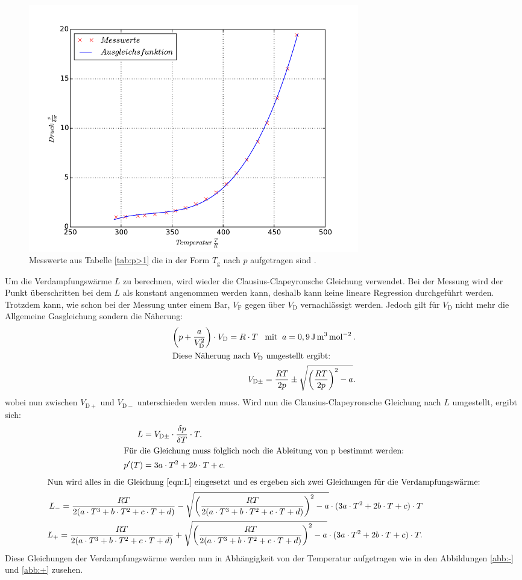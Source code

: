 \begin{figure}
  \centering
  \includegraphics[width=0.7\textwidth]{plot2.pdf}
  \caption{Messwerte aus Tabelle \ref{tab:p>1} die in der Form $T_\mathrm{g}$ nach $p$ aufgetragen sind .}
  \label{abb:plot2}
\end{figure}
\FloatBarrier
Um  die Verdampfungswärme $L$ zu berechnen,
wird wieder die Clausius-Clapeyronsche Gleichung
verwendet. Bei der Messung wird der Punkt überschritten bei dem $L$ als konstant angenommen werden kann, deshalb kann
keine lineare Regression durchgeführt werden.
Trotzdem kann, wie schon bei der Messung unter einem Bar,
$V_\mathrm{F}$ gegen über $V_\mathrm{D}$ vernachlässigt werden.
Jedoch gilt für $V_\mathrm{D}$ nicht mehr die Allgemeine
Gasgleichung sondern die Näherung:
\begin{align}
\left(p+\frac{a}{V_\mathrm{D}^2}\right)\cdot V_\mathrm{D}=R\cdot T \; \; \; \text{mit} \;\; a=0,9\,\si{\joule\cubic\meter\per\mol\tothe{2}}\,.\\
\intertext{Diese Näherung nach $V_\mathrm{D}$ umgestellt ergibt:}
V_{\mathrm{D\pm}}=\frac{RT}{2p}\pm\sqrt{\left(\frac{RT}{2p}\right)^2-a}.
\end{align}
wobei nun zwischen $V_\mathrm{D+}$ und  $V_\mathrm{D-}$ unterschieden werden muss.
Wird nun die Clausius-Clapeyronsche Gleichung nach $L$ umgestellt, ergibt sich:
\begin{align}
L&=V_\mathrm{D\pm}\cdot \frac{\delta p}{\delta T} \cdot T.\label{eqn:L}\\
\intertext{Für die Gleichung muss folglich noch die Ableitung von p bestimmt werden:}
p'(T)&=3a\cdot T^2+ 2b\cdot T + c.
\end{align}
\begin{align}
\intertext{Nun wird alles in die Gleichung \eqref{eqn:L} eingesetzt und es ergeben sich zwei Gleichungen für die Verdampfungswärme:}
L_-=\frac{RT}{2(a\cdot T^3+b\cdot T^2 + c\cdot T + d)}-\sqrt{\left(\frac{RT}{2(a\cdot T^3+b\cdot T^2 + c\cdot T + d)}\right)^2-a} \cdot (3a\cdot T^2+ 2b\cdot T + c )\cdot T\label{eqn:L-}\\
L_+=\frac{RT}{2(a\cdot T^3+b\cdot T^2 + c\cdot T + d)}+\sqrt{\left(\frac{RT}{2(a\cdot T^3+b\cdot T^2 + c\cdot T + d)}\right)^2-a} \cdot (3a\cdot T^2+ 2b\cdot T + c)\cdot T.\label{eqn:L+}
\end{align}
Diese Gleichungen der Verdampfungswärme werden nun in Abhängigkeit
von der Temperatur aufgetragen wie in den Abbildungen \ref{abb:-} und \ref{abb:+}
zusehen.


